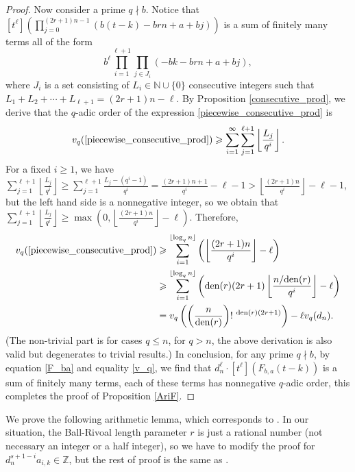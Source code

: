 \documentclass[11pt]{amsart}
\numberwithin{equation}{section}
\begin{document}
\begin{proof}
Now consider a prime $q \nmid b$. Notice that $[t^{\ell}]\left(\prod_{j=0}^{(2r+1)n -1} \left( b(t-k)-brn + a + bj \right)\right)$ is a sum of finitely many terms all of the form
\begin{equation}\label{piecewise_consecutive_prod}
 b^{\ell} \prod_{i=1}^{\ell + 1}\prod_{j \in J_i} \left( -bk-brn + a + bj \right),
\end{equation}
where $J_i$ is a set consisting of $L_i \in \mathbb{N} \cup \{ 0 \}$ consecutive integers such that $L_1 + L_2 + \cdots + L_{\ell + 1} = (2r+1)n - \ell $. By Proposition \ref{consecutive_prod}, we derive that the $q$-adic order of the expression \eqref{piecewise_consecutive_prod} is
\[ v_q(\eqref{piecewise_consecutive_prod}) \geqslant  \sum_{i=1}^{\infty} \sum_{j=1}^{\ell + 1} \left\lfloor \frac{L_j}{q^i} \right\rfloor. \]
For a fixed $i \geqslant 1$, we have $\sum_{j=1}^{\ell + 1} \left\lfloor \frac{L_j}{q^i} \right\rfloor \geqslant \sum_{j=1}^{\ell + 1} \frac{L_j - (q^i - 1)}{q^i} = \frac{(2r+1)n+1}{q^i} - \ell - 1 > \left\lfloor \frac{(2r+1)n}{q^i} \right\rfloor - \ell - 1$, but the left hand side is a nonnegative integer, so we obtain that $\sum_{j=1}^{\ell + 1} \left\lfloor \frac{L_j}{q^i} \right\rfloor \geqslant \max(0, \left\lfloor \frac{(2r+1)n}{q^i} \right\rfloor - \ell)$. Therefore,
\begin{align}
v_q(\eqref{piecewise_consecutive_prod}) &\geqslant \sum_{i=1}^{\lfloor \log_q n \rfloor} \left( \left\lfloor \frac{(2r+1)n}{q^i} \right\rfloor - \ell \right) \nonumber \\
&\geqslant \sum_{i=1}^{\lfloor \log_q n \rfloor} \left( {\rm den}(r)(2r+1) \left\lfloor \frac{n/{\rm den}(r)}{q^i} \right\rfloor - \ell \right) \label{v_q} \\
&= v_q\left( \left( \frac{n}{{\rm den}(r)} \right)!~^{{\rm den}(r)(2r+1)} \right) - \ell v_q(d_n). \nonumber
\end{align}
(The non-trivial part is for cases $q\leqslant n$, for $q>n$, the above derivation is also valid but degenerates to trivial results.) In conclusion, for any prime $q \nmid b$, by equation \eqref{F_ba} and equality \eqref{v_q}, we find that $d_{n}^{\ell} \cdot [t^{\ell}](F_{b,a}(t-k))$ is a sum of finitely many terms, each of these terms has nonnegative $q$-adic order, this completes the proof of Proposition \ref{AriF}.
\end{proof}

We prove the following arithmetic lemma, which corresponds to \cite[Lemma 2]{FSZ2019}. In our situation, the Ball-Rivoal length parameter $r$ is just a rational number (not necessary an integer or a half integer), so we have to modify the proof for $d_n^{s+1-i} a_{i,k} \in \mathbb{Z}$, but the rest of proof is the same as \cite[Lemma 2]{FSZ2019}.
\end{document}
